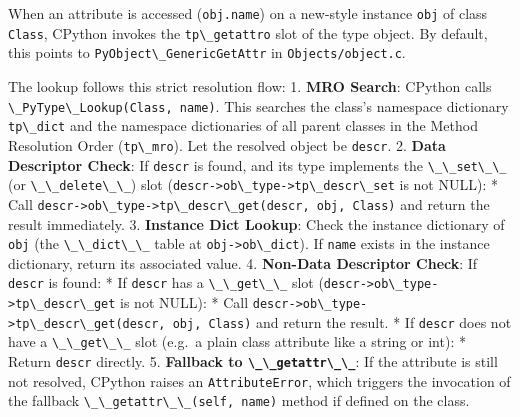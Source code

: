 When an attribute is accessed (\passthrough{\lstinline!obj.name!}) on a
new-style instance \passthrough{\lstinline!obj!} of class
\passthrough{\lstinline!Class!}, CPython invokes the
\passthrough{\lstinline!tp\_getattro!} slot of the type object. By
default, this points to
\passthrough{\lstinline!PyObject\_GenericGetAttr!} in
\passthrough{\lstinline!Objects/object.c!}.

The lookup follows this strict resolution flow: 1. \textbf{MRO Search}:
CPython calls \passthrough{\lstinline!\_PyType\_Lookup(Class, name)!}.
This searches the class's namespace dictionary
\passthrough{\lstinline!tp\_dict!} and the namespace dictionaries of all
parent classes in the Method Resolution Order
(\passthrough{\lstinline!tp\_mro!}). Let the resolved object be
\passthrough{\lstinline!descr!}. 2. \textbf{Data Descriptor Check}: If
\passthrough{\lstinline!descr!} is found, and its type implements the
\passthrough{\lstinline!\_\_set\_\_!} (or
\passthrough{\lstinline!\_\_delete\_\_!}) slot
(\passthrough{\lstinline!descr->ob\_type->tp\_descr\_set!} is not NULL):
* Call
\passthrough{\lstinline!descr->ob\_type->tp\_descr\_get(descr, obj, Class)!}
and return the result immediately. 3. \textbf{Instance Dict Lookup}:
Check the instance dictionary of \passthrough{\lstinline!obj!} (the
\passthrough{\lstinline!\_\_dict\_\_!} table at
\passthrough{\lstinline!obj->ob\_dict!}). If
\passthrough{\lstinline!name!} exists in the instance dictionary, return
its associated value. 4. \textbf{Non-Data Descriptor Check}: If
\passthrough{\lstinline!descr!} is found: * If
\passthrough{\lstinline!descr!} has a
\passthrough{\lstinline!\_\_get\_\_!} slot
(\passthrough{\lstinline!descr->ob\_type->tp\_descr\_get!} is not NULL):
* Call
\passthrough{\lstinline!descr->ob\_type->tp\_descr\_get(descr, obj, Class)!}
and return the result. * If \passthrough{\lstinline!descr!} does not
have a \passthrough{\lstinline!\_\_get\_\_!} slot (e.g.~a plain class
attribute like a string or int): * Return
\passthrough{\lstinline!descr!} directly. 5. \textbf{Fallback to
\passthrough{\lstinline!\_\_getattr\_\_!}}: If the attribute is still
not resolved, CPython raises an
\passthrough{\lstinline!AttributeError!}, which triggers the invocation
of the fallback \passthrough{\lstinline!\_\_getattr\_\_(self, name)!}
method if defined on the class.

